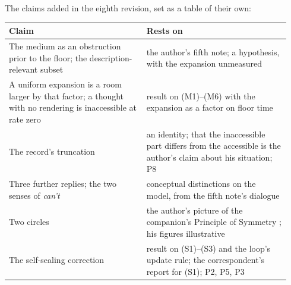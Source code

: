 \noindent The claims added in the eighth revision, set as a table of their own:
\begin{center}\small
\begin{tabular}{p{0.46\linewidth} p{0.48\linewidth}}
\toprule
Claim & Rests on \\
\midrule
The medium as an obstruction prior to the floor; the description-relevant subset & the author's fifth note; a hypothesis, with the expansion unmeasured \\
A uniform expansion is a room larger by that factor; a thought with no rendering is inaccessible at rate zero & result on (M1)--(M6) with the expansion as a factor on floor time \\
The record's truncation & an identity; that the inaccessible part differs from the accessible is the author's claim about his situation; P8 \\
Three further replies; the two senses of \emph{can't} & conceptual distinctions on the model, from the fifth note's dialogue \\
Two circles & the author's picture of the companion's Principle of Symmetry \cite{NormCost}; his figures illustrative \\
The self-sealing correction & result on (S1)--(S3) and the loop's update rule; the correspondent's report for (S1); P2, P5, P3 \\
\bottomrule
\end{tabular}
\end{center}

